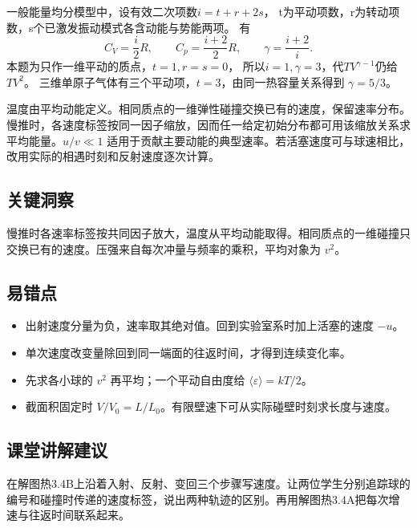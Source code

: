 \documentclass[UTF8,fontset=fandol,a4paper,11pt]{ctexart}
\begin{document}
一般能量均分模型中，设有效二次项数$i=t+r+2s$，
t为平动项数，r为转动项数，s个已激发振动模式各含动能与势能两项。
有
\[
C_V=\frac i2R,\qquad C_p=\frac{i+2}{2}R,\qquad
\gamma=\frac{i+2}{i}.
\]
本题为只作一维平动的质点，$t=1,r=s=0$，
所以$i=1,\gamma=3$，代$TV^{\gamma-1}$仍给$TV^2$。
三维单原子气体有三个平动项，$t=3$，由同一热容量关系得到 $\gamma=5/3$。

温度由平均动能定义。相同质点的一维弹性碰撞交换已有的速度，保留速率分布。慢推时，各速度标签按同一因子缩放，因而任一给定初始分布都可用该缩放关系求平均能量。$u/v\ll1$ 适用于贡献主要动能的典型速率。若活塞速度可与球速相比，改用实际的相遇时刻和反射速度逐次计算。




\subsection*{关键洞察}

慢推时各速率标签按共同因子放大，温度从平均动能取得。相同质点的一维碰撞只交换已有的速度。压强来自每次冲量与频率的乘积，平均对象为 $v^2$。



\subsection*{易错点}

\begin{itemize}
\item 出射速度分量为负，速率取其绝对值。回到实验室系时加上活塞的速度 $-u$。
\item 单次速度改变量除回到同一端面的往返时间，才得到连续变化率。
\item 先求各小球的 $v^2$ 再平均；一个平动自由度给 $\langle\varepsilon\rangle=kT/2$。
\item 截面积固定时 $V/V_0=L/L_0$。有限壁速下可从实际碰壁时刻求长度与速度。
\end{itemize}



\subsection*{课堂讲解建议}

在解图热3.4B上沿着入射、反射、变回三个步骤写速度。让两位学生分别追踪球的编号和碰撞时传递的速度标签，说出两种轨迹的区别。再用解图热3.4A把每次增速与往返时间联系起来。
\end{document}
